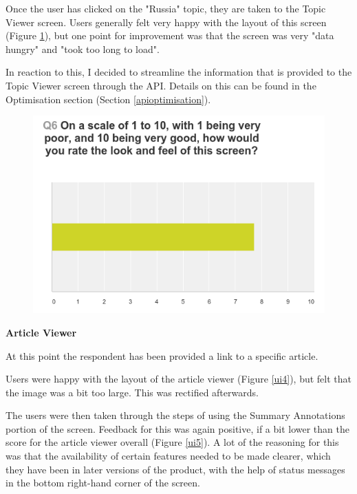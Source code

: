 \documentclass[12pt]{article}
\begin{document}
Once the user has clicked on the "Russia" topic, they are taken to the Topic Viewer screen. Users generally felt very happy with the layout of this screen (Figure \ref{ui3}), but one point for improvement was that the screen was very "data hungry" and "took too long to load".

In reaction to this, I decided to streamline the information that is provided to the Topic Viewer screen through the API. Details on this can be found in the Optimisation section (Section \ref{apioptimisation}). \\

\begin{figure}[ht!]
  \centering
    \includegraphics[scale=0.5]{ui3.png}
   \caption[A graph depicting responses to the User Interface Survey]{}
   \label{ui3}
\end{figure} 

\textbf{Article Viewer}

At this point the respondent has been provided a link to a specific article. 

Users were happy with the layout of the article viewer (Figure \ref{ui4}), but felt that the image was a bit too large. This was rectified afterwards.

The users were then taken through the steps of using the Summary Annotations portion of the screen. Feedback for this was again positive, if a bit lower than the score for the article viewer overall (Figure \ref{ui5}). A lot of the reasoning for this was that the availability of certain features needed to be made clearer, which they have been in later versions of the product, with the help of status messages in the bottom right-hand corner of the screen. \\
\end{document}
